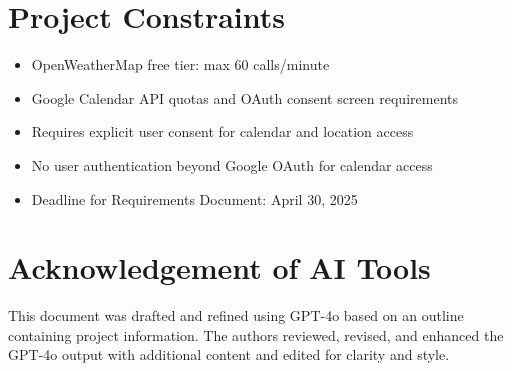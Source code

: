 \documentclass[11pt,a4paper]{article}
\begin{document}
\section{Project Constraints}
\begin{itemize}[nosep]
  \item OpenWeatherMap free tier: max 60 calls/minute
  \item Google Calendar API quotas and OAuth consent screen requirements
  \item Requires explicit user consent for calendar and location access
  \item No user authentication beyond Google OAuth for calendar access
  \item Deadline for Requirements Document: April 30, 2025
\end{itemize}

\section{Acknowledgement of AI Tools}
This document was drafted and refined using GPT-4o based on an outline containing project information. The authors reviewed, revised, and enhanced the GPT-4o output with additional content and edited for clarity and style.
\end{document}
